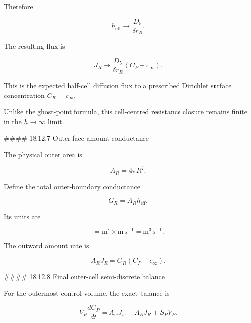 \documentclass[11pt,a4paper]{article}
\begin{document}
Therefore

\begin{equation}
\boxed{
h_{\mathrm{eff}}
\to
\frac{D_5}{\delta r_R}.
}
\tag{TRISO-FV-213}
\label{eq:triso-fv-213}
\end{equation}

The resulting flux is

\begin{equation}
J_R
\to
\frac{D_5}{\delta r_R}
(C_P-c_\infty).
\tag{TRISO-FV-214}
\label{eq:triso-fv-214}
\end{equation}

This is the expected half-cell diffusion flux to a prescribed Dirichlet surface concentration $C_R=c_\infty$.

Unlike the ghost-point formula, this cell-centred resistance closure remains finite in the $h\to\infty$ limit.

\#\#\#\# 18.12.7 Outer-face amount conductance

The physical outer area is

\begin{equation}
\boxed{
A_R=4\pi R^2.
}
\tag{TRISO-FV-215}
\label{eq:triso-fv-215}
\end{equation}

Define the total outer-boundary conductance

\begin{equation}
\boxed{
G_R=A_Rh_{\mathrm{eff}}.
}
\tag{TRISO-FV-216}
\label{eq:triso-fv-216}
\end{equation}

Its units are

\begin{equation}
[G_R]
=
\mathrm{m^2}
\times
\mathrm{m\,s^{-1}}
=
\mathrm{m^3\,s^{-1}}.
\tag{TRISO-FV-217}
\label{eq:triso-fv-217}
\end{equation}

The outward amount rate is

\begin{equation}
A_RJ_R
=
G_R(C_P-c_\infty).
\tag{TRISO-FV-218}
\label{eq:triso-fv-218}
\end{equation}

\#\#\#\# 18.12.8 Final outer-cell semi-discrete balance

For the outermost control volume, the exact balance is

\begin{equation}
V_P\frac{dC_P}{dt}
=
A_wJ_w
-
A_RJ_R
+
S_PV_P.
\tag{TRISO-FV-219}
\label{eq:triso-fv-219}
\end{equation}
\end{document}
